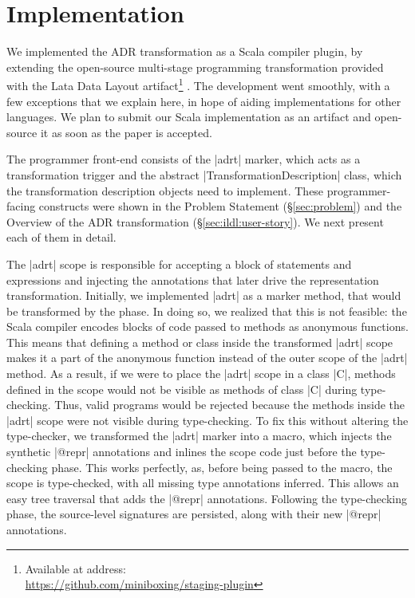 \section{Implementation}
\label{sec:impl}

We implemented the ADR transformation as a Scala compiler plugin, by extending the open-source multi-stage programming transformation provided with the Lata Data Layout artifact\footnote{Available at address:\\ \url{https://github.com/miniboxing/staging-plugin}} \cite{ldl}. The development went smoothly, with a few exceptions that we explain here, in hope of aiding implementations for other languages. We plan to submit our Scala implementation as an artifact and open-source it as soon as the paper is accepted.

The programmer front-end consists of the |adrt| marker, which acts as a transformation trigger and the abstract |TransformationDescription| class, which the transformation description objects need to implement. These programmer-facing constructs were shown in the Problem Statement (\S\ref{sec:problem}) and the Overview of the ADR transformation (\S\ref{sec:ildl:user-story}). We next present each of them in detail.

The |adrt| scope is responsible for accepting a block of statements
and expressions and injecting the annotations that later drive the
representation transformation. Initially, we implemented |adrt| as a
marker method, that would be transformed by the \inject{} phase. In
doing so, we realized that this is not feasible: the Scala compiler
encodes blocks of code passed to methods as anonymous functions. This
means that defining a method or class inside the transformed |adrt|
scope makes it a part of the anonymous function instead of the outer
scope of the |adrt| method. As a result, if we were to place the
|adrt| scope in a class |C|, methods defined in the scope would not be
visible as methods of class |C| during type-checking. Thus, valid
programs would be rejected because the methods inside the |adrt| scope
were not visible during type-checking. To fix this without altering
the type-checker, we transformed the |adrt| marker into a macro, which
injects the synthetic |@repr| annotations and inlines the scope code
just before the type-checking phase. This works perfectly, as, before
being passed to the macro, the scope is type-checked, with all missing
type annotations inferred. This allows an easy tree traversal that
adds the |@repr| annotations. Following the type-checking phase, the
source-level signatures are persisted, along with their new |@repr|
annotations.

